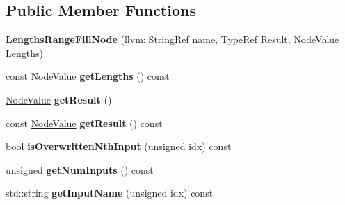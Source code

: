 \subsection*{Public Member Functions}
\begin{DoxyCompactItemize}
\item 
\mbox{\label{classglow_1_1_lengths_range_fill_node_a3711fa76d8f6e4cf78a6ae16b416cb27}} 
{\bfseries Lengths\+Range\+Fill\+Node} (llvm\+::\+String\+Ref name, \hyperlink{structglow_1_1_type}{Type\+Ref} Result, \hyperlink{structglow_1_1_node_value}{Node\+Value} Lengths)
\item 
\mbox{\label{classglow_1_1_lengths_range_fill_node_af7ea579f96d87cc7897a70b488629f96}} 
const \hyperlink{structglow_1_1_node_value}{Node\+Value} {\bfseries get\+Lengths} () const
\item 
\mbox{\label{classglow_1_1_lengths_range_fill_node_ae76a11a709192a66227a401d78b4ed59}} 
\hyperlink{structglow_1_1_node_value}{Node\+Value} {\bfseries get\+Result} ()
\item 
\mbox{\label{classglow_1_1_lengths_range_fill_node_adfbcaccec7e52e3e657933cece0305a8}} 
const \hyperlink{structglow_1_1_node_value}{Node\+Value} {\bfseries get\+Result} () const
\item 
\mbox{\label{classglow_1_1_lengths_range_fill_node_a7405a84ce500d0325c8b3a058aaba7f2}} 
bool {\bfseries is\+Overwritten\+Nth\+Input} (unsigned idx) const
\item 
\mbox{\label{classglow_1_1_lengths_range_fill_node_a03124c80155a51afe16d64d55c6f9dea}} 
unsigned {\bfseries get\+Num\+Inputs} () const
\item 
\mbox{\label{classglow_1_1_lengths_range_fill_node_a7ce1ec4c2790d58f7b5ef773604b2209}} 
std\+::string {\bfseries get\+Input\+Name} (unsigned idx) const
\item 
\mbox{\label{classglow_1_1_lengths_range_fill_node_a837af67985849f03f9602e970e712f1d}} 

\end{DoxyCompactItemize}
